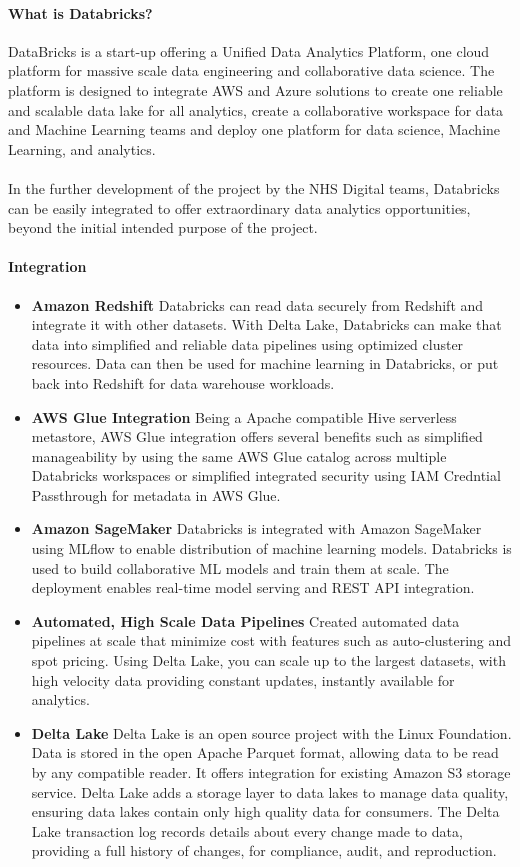 \documentclass[10pt]{article}
\begin{document}
\paragraph{What is Databricks?} DataBricks is a start-up offering a Unified Data Analytics Platform, one cloud platform for massive scale data engineering and collaborative data science. The platform is designed to integrate AWS and Azure solutions to create one reliable and scalable data lake
for all analytics, create a collaborative workspace for data and Machine Learning teams and deploy one platform for data science, Machine Learning, and analytics. \cite{databricks}
\\ \\
In the further development of the project by the NHS Digital teams, Databricks can be easily integrated to offer extraordinary data analytics opportunities, beyond the initial intended purpose of the project.
\\
\paragraph{Integration}
\begin{itemize}
    \item \textbf{Amazon Redshift} Databricks can read data securely from Redshift and integrate it with other datasets. With Delta Lake, Databricks can make that data into simplified and reliable data pipelines using optimized cluster resources. Data can then be used for machine learning in Databricks, or put back into Redshift for data warehouse workloads.
    \item \textbf{AWS Glue Integration} Being a Apache compatible Hive serverless metastore, AWS Glue integration offers several benefits such as simplified manageability by using the same AWS Glue catalog across multiple Databricks workspaces or simplified integrated security using IAM Credntial Passthrough for metadata in AWS Glue.
    \item \textbf{Amazon SageMaker} Databricks is integrated with Amazon SageMaker using MLflow to enable distribution of machine learning models. Databricks is used to build collaborative ML models and train them at scale. The deployment enables real-time model serving and REST API integration.
    \item \textbf{Automated, High Scale Data Pipelines} Created automated data pipelines at scale that minimize cost with features such as auto-clustering and spot pricing. Using Delta Lake, you can scale up to the largest datasets, with high velocity data providing constant updates, instantly available for analytics.
	\item \textbf{Delta Lake} Delta Lake is an open source project with the Linux Foundation. Data is stored in the open Apache Parquet format, allowing data to be read by any compatible reader. It offers integration for existing Amazon S3 storage service. Delta Lake adds a storage layer to data lakes to manage data quality, ensuring data lakes contain only high quality data for consumers. The Delta Lake transaction log records details about every change made to data, providing a full history of changes, for compliance, audit, and reproduction.
\end{itemize}
\end{document}
